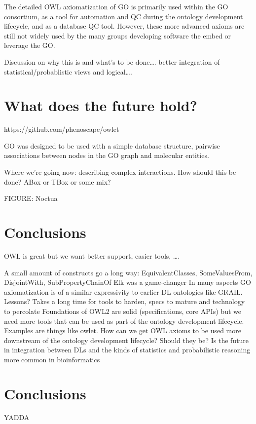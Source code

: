 \documentclass{llncs}
\begin{document}
The detailed OWL axiomatization of GO is primarily used within the GO consortium, as a tool for automation and QC during the ontology development lifecycle, and as a database QC tool. However, these more advanced axioms are still not widely used by the many groups developing software the embed or leverage the GO.

Discussion on why this is and what’s to be done…. better integration of statistical/probablistic views and logical….


\section{What does the future hold?}

https://github.com/phenoscape/owlet

GO was designed to be used with a simple database structure, pairwise associations between nodes in the GO graph and molecular entities. 

Where we’re going now: describing complex interactions. How should this be done? ABox or TBox or some mix? 

FIGURE: Noctua

\section{Conclusions}


OWL is great but we want better support, easier tools, ….

A small amount of constructs go a long way: EquivalentClasses, SomeValuesFrom, DisjointWith, SubProperty{Chain}Of
Elk was a game-changer
In many aspects GO axiomatization is of a similar expressivity to earlier DL ontologies like GRAIL. Lessons? Takes a long time for tools to harden, specs to mature and technology to percolate
Foundations of OWL2 are solid (specifications, core APIs) but we need more tools that can be used as part of the ontology development lifecycle. Examples are things like owlet.
How can we get OWL axioms to be used more downstream of the ontology development lifecycle? Should they be? Is the future in integration between DLs and the kinds of statistics and probabilistic reasoning more common in bioinformatics























\section{Conclusions}

YADDA



\end{document}
